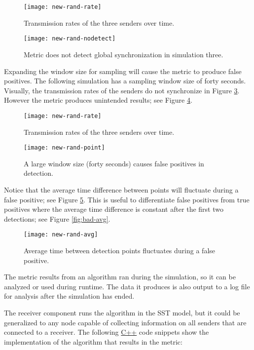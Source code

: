 \documentclass{article}
\newcommand{\plotsize}{0.23}
\begin{document}
\begin{figure}[H]
	\centering
	\texttt{[image: new-rand-rate]}
	\caption{Transmission rates of the three senders over time.}
	\label{fig:rand-rate}
\end{figure}

\begin{figure}[H]
	\centering
	\texttt{[image: new-rand-nodetect]}
	\caption{Metric does not detect global synchronization in simulation three.}
	\label{fig:rand-metric}
\end{figure}

Expanding the window size for sampling will cause the metric to produce false positives. The following simulation has a sampling window size of forty seconds. Visually, the transmission rates of the senders do not synchronize in Figure \ref{fig:falpos-rate}. However the metric produces unintended results; see Figure \ref{fig:falpos-metric}.

\begin{figure}[H]
	\centering
	\texttt{[image: new-rand-rate]}
	\caption{Transmission rates of the three senders over time.}
	\label{fig:falpos-rate}
\end{figure}

\begin{figure}[H]
	\centering
	\texttt{[image: new-rand-point]}
	\caption{A large window size (forty seconds) causes false positives in detection.}
	\label{fig:falpos-metric}
\end{figure}

Notice that the average time difference between points will fluctuate during a false positive; see Figure \ref{fig:falpos-avg}. This is useful to differentiate false positives from true positives where the average time difference is constant after the first two detections; see Figure \ref{fig:bad-avg}.

\begin{figure}[H]
	\centering
	\texttt{[image: new-rand-avg]}
	\caption{Average time between detection points fluctuates during a false positive.}
	\label{fig:falpos-avg}
\end{figure}


The metric results from an algorithm ran during the simulation, so it can be analyzed or used during runtime. The data it produces is also output to a log file for analysis after the simulation has ended.

The receiver component runs the algorithm in the SST model, but it could be generalized to any node capable of collecting information on all senders that are connected to a receiver. The following \href{https://en.wikipedia.org/wiki/C%2B%2B}{C++} code snippets show the implementation of the algorithm that results in the metric:\newline
\end{document}
